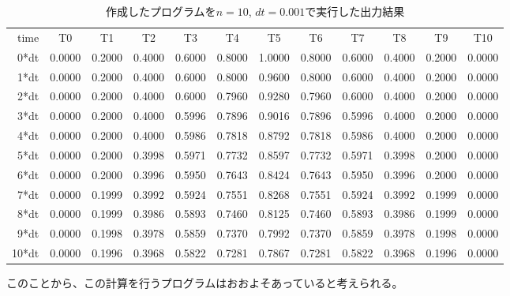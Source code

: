 \documentclass{jsarticle}
\begin{document}
\begin{table}[H]
	\caption[出力結果]{作成したプログラムを$n=10$, $dt=0.001$で実行した出力結果}
	\label{tab02}
	\begin{center}
		\setlength{\tabcolsep}{3pt}
		\footnotesize
		\begin{tabular}{rccccccccccc}
			time & T0 & T1 & T2 & T3 & T4 & T5 & T6 & T7 & T8 & T9 & T10	\\
			0*dt & 0.0000 & 0.2000 & 0.4000 & 0.6000 & 0.8000 & 1.0000 & 0.8000 & 0.6000 & 0.4000 & 0.2000 & 0.0000	\\
			1*dt & 0.0000 & 0.2000 & 0.4000 & 0.6000 & 0.8000 & 0.9600 & 0.8000 & 0.6000 & 0.4000 & 0.2000 & 0.0000	\\
			2*dt & 0.0000 & 0.2000 & 0.4000 & 0.6000 & 0.7960 & 0.9280 & 0.7960 & 0.6000 & 0.4000 & 0.2000 & 0.0000	\\
			3*dt & 0.0000 & 0.2000 & 0.4000 & 0.5996 & 0.7896 & 0.9016 & 0.7896 & 0.5996 & 0.4000 & 0.2000 & 0.0000	\\
			4*dt & 0.0000 & 0.2000 & 0.4000 & 0.5986 & 0.7818 & 0.8792 & 0.7818 & 0.5986 & 0.4000 & 0.2000 & 0.0000	\\
			5*dt & 0.0000 & 0.2000 & 0.3998 & 0.5971 & 0.7732 & 0.8597 & 0.7732 & 0.5971 & 0.3998 & 0.2000 & 0.0000	\\
			6*dt & 0.0000 & 0.2000 & 0.3996 & 0.5950 & 0.7643 & 0.8424 & 0.7643 & 0.5950 & 0.3996 & 0.2000 & 0.0000	\\
			7*dt & 0.0000 & 0.1999 & 0.3992 & 0.5924 & 0.7551 & 0.8268 & 0.7551 & 0.5924 & 0.3992 & 0.1999 & 0.0000	\\
			8*dt & 0.0000 & 0.1999 & 0.3986 & 0.5893 & 0.7460 & 0.8125 & 0.7460 & 0.5893 & 0.3986 & 0.1999 & 0.0000	\\
			9*dt & 0.0000 & 0.1998 & 0.3978 & 0.5859 & 0.7370 & 0.7992 & 0.7370 & 0.5859 & 0.3978 & 0.1998 & 0.0000	\\
			10*dt & 0.0000 & 0.1996 & 0.3968 & 0.5822 & 0.7281 & 0.7867 & 0.7281 & 0.5822 & 0.3968 & 0.1996 & 0.0000	\\
		\end{tabular}
	\end{center}
\end{table}%
このことから、この計算を行うプログラムはおおよそあっていると考えられる。
\end{document}

